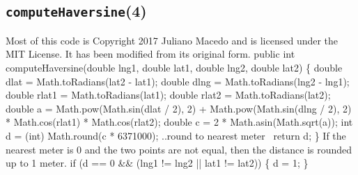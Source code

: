 \documentclass{article}
\def\nwendcode{\endtrivlist \endgroup}      %
\let\nwdocspar=\par
\begin{document}
\subsection{{\tt{}\protect{}computeHaversine}(4)}
Most of this code is Copyright 2017 Juliano Macedo and is licensed under the
MIT License. It has been modified from its original form.
\nwenddocs{}\endmoddef{}
public int computeHaversine(double lng1, double lat1, double lng2, double lat2) \{
  double dlat = Math.toRadians(lat2 - lat1);
  double dlng = Math.toRadians(lng2 - lng1);
  double rlat1 = Math.toRadians(lat1);
  double rlat2 = Math.toRadians(lat2);
  double a = Math.pow(Math.sin(dlat / 2), 2)
    + Math.pow(Math.sin(dlng / 2), 2)
    * Math.cos(rlat1) * Math.cos(rlat2);
  double c = 2 * Math.asin(Math.sqrt(a));
  int d = (int) Math.round(c * 6371000);
  \LA{}..round to nearest meter~{\nwtagstyle{}}\RA{}
  return d;
\}
\eatline
{}\nwendcode{}If the nearest meter is 0 and the two points are not equal, then the distance
is rounded up to 1 meter.
\nwenddocs{}\endmoddef{}
if (d == 0 && (lng1 != lng2 || lat1 != lat2)) \{
  d = 1;
\}
\nwendcode{}\nwdocspar
\end{document}
